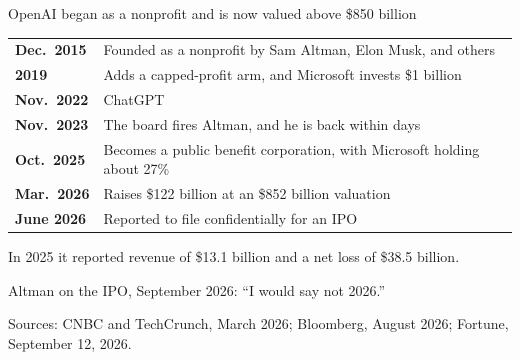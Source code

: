 \documentclass[aspectratio=169,11pt]{beamer}
\begin{document}
\begin{frame}{OpenAI began as a nonprofit and is now valued above \$850 billion}

\begin{center}
\footnotesize
\begin{tabular}{@{}ll@{}}
\toprule
\textbf{Dec.\ 2015} & Founded as a nonprofit by Sam Altman, Elon Musk, and others \\
\textbf{2019} & Adds a capped-profit arm, and Microsoft invests \$1 billion \\
\textbf{Nov.\ 2022} & ChatGPT \\
\textbf{Nov.\ 2023} & The board fires Altman, and he is back within days \\
\textbf{Oct.\ 2025} & Becomes a public benefit corporation, with Microsoft holding about 27\% \\
\textbf{Mar.\ 2026} & Raises \$122 billion at an \$852 billion valuation \\
\textbf{June 2026} & Reported to file confidentially for an IPO \\
\bottomrule
\end{tabular}
\end{center}

\vspace{0.3cm}

In 2025 it reported revenue of \$13.1 billion and a net loss of \$38.5 billion.

\vspace{0.25cm}

\alert{Altman on the IPO, September 2026: ``I would say not 2026.''}

\vspace{0.1cm}
{\scriptsize\color{warmgray}Sources: CNBC and TechCrunch, March 2026; Bloomberg, August 2026; Fortune, September 12, 2026.}

\end{frame}
\end{document}
